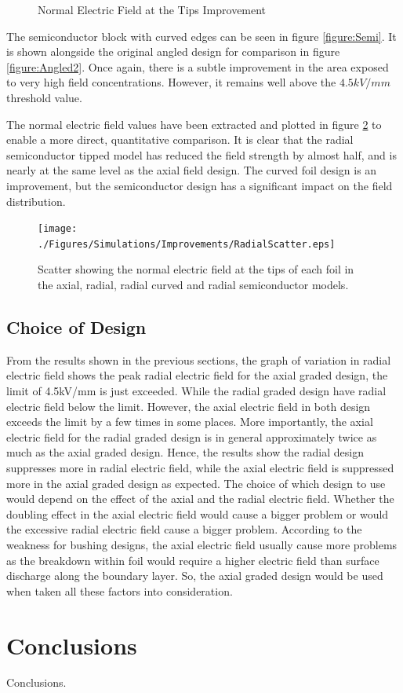 \begin{figure}[!h]
\centering
{}
\caption{Normal Electric Field at the Tips Improvement}
\label{figure:semicompare}
\end{figure}

The semiconductor block with curved edges can be seen in figure \ref{figure:Semi}.
It is shown alongside the original angled design for comparison in figure \ref{figure:Angled2}.
Once again, there is a subtle improvement in the area exposed to very high field concentrations.
However, it remains well above the $4.5kV/mm$ threshold value.

The normal electric field values have been extracted and plotted in figure \ref{figure:scattercomp} to enable a more direct, quantitative comparison.
It is clear that the radial semiconductor tipped model has reduced the field strength by almost half, and is nearly at the same level as the axial field design.
The curved foil design is an improvement, but the semiconductor design has a significant impact on the field distribution.

\begin{figure}[!h]
\centering
\texttt{[image: ./Figures/Simulations/Improvements/RadialScatter.eps]}
\caption{Scatter showing the normal electric field at the tips of each foil in the axial, radial, radial curved and radial semiconductor models.}
\label{figure:scattercomp}
\end{figure}


\subsection{Choice of Design}
From the results shown in the previous sections, the graph of variation in radial electric field shows the peak radial electric field for the axial graded design, the limit of 4.5kV/mm is just exceeded. While the radial graded design have radial electric field below the limit. However, the axial electric field in both design exceeds the limit by a few times in some places. More importantly, the axial electric field for the radial graded design is in general approximately twice as much as the axial graded design. Hence, the results show the radial design suppresses more in radial electric field, while the axial electric field is suppressed more in the axial graded design as expected. The choice of which design to use would depend on the effect of the axial and the radial electric field. Whether the doubling effect in the axial electric field would cause a bigger problem or would the excessive radial electric field cause a bigger problem. According to the weakness for bushing designs, the axial electric field usually cause more problems as the breakdown within foil would require a higher electric field than surface discharge along the boundary layer. So, the axial graded design would be used when taken all these factors into consideration.

\section{Conclusions}
Conclusions.

